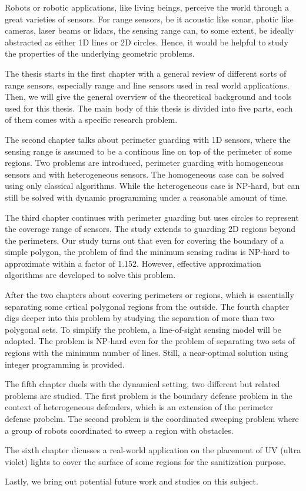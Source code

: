 \begin{my_abstract}

Robots or robotic applications, like living beings, perceive the world through
a great varieties of sensors.
For range sensors, be it acoustic like sonar, photic like cameras, laser beams or lidars, 
the sensing range can, to some extent, be ideally abstracted as either 1D lines or 2D circles.
Hence, it would be helpful to study the properties of the underlying geometric problems.

The thesis starts in the first chapter with a general review of different sorts of range sensors, 
especially range and line sensors used in real world applications. 
Then, we will give the general overview of the theoretical background and tools used for this thesis. 
The main body of this thesis is divided into five parts, each of them comes with 
a specific research problem. 

The second chapter talks about perimeter guarding with 1D sensors, where the sensing range 
is assumed to be a continous line on top of the perimeter of some regions. Two problems are 
introduced, perimeter guarding with homogeneous sensors and with heterogeneous sensors. 
The homogeneous case can be solved using only classical algorithms. 
While the heterogeneous case is NP-hard, but can still be solved with dynamic programming under a reasonable
amount of time. 

The third chapter continues with perimeter guarding but uses circles to represent the 
coverage range of sensors. The study extends to guarding 2D regions beyond the perimeters. 
Our study turns out that even for covering the boundary of a simple polygon, 
the problem of find the minimum sensing radius is NP-hard to approximate within a factor of 1.152. 
However, effective approximation algorithms are developed to solve this problem. 

After the two chapters about covering perimeters or regions, which is essentially separating 
some crtical polygonal regions from the outside. 
The fourth chapter digs deeper into this problem by studying the separation of more than two polygonal sets. 
To simplify the problem, a line-of-sight sensing model will be adopted. 
The problem is NP-hard even for the problem of separating two sets of regions with the minimum number of lines.
Still, a near-optimal solution using integer programming is provided.

The fifth chapter duels with the dynamical setting, two different but related problems are studied. 
The first problem is the boundary defense problem in the context of heterogeneous defenders,
which is an extension of the perimeter defense probelm. 
The second problem is the coordinated sweeping problem where a group of robots coordinated to sweep a region with obstacles. 

The sixth chapter dicusses a real-world application on the placement of UV (ultra violet) lights
to cover the surface of some regions for the sanitization purpose. 

Lastly, we bring out potential future work and studies on this subject.

\end{my_abstract}
